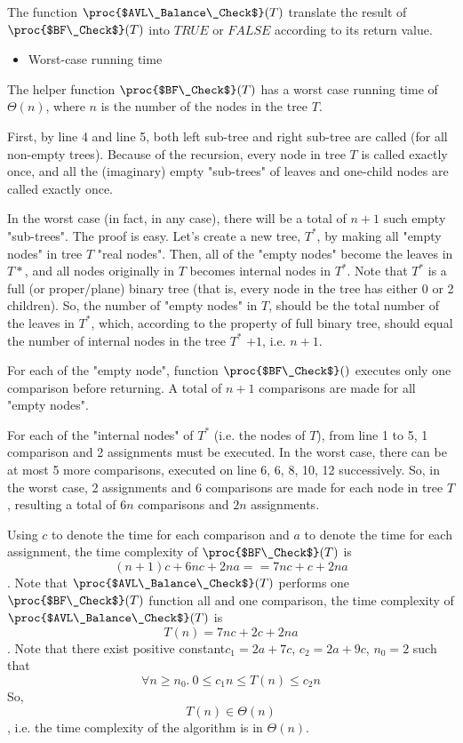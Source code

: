 \documentclass[11pt, answers]{exam}
\theoremstyle{plain}
\theoremstyle{definition}
\begin{document}
\begin{questions}
\begin{solution}
The function $\proc{$AVL\_Balance\_Check$}(T)$ translate the result of $\proc{$BF\_Check$}(T)$ into $TRUE$ or $FALSE$ according to its return value.
\begin{itemize}
\item Worst-case running time
\end{itemize}
The helper function $\proc{$BF\_Check$}(T)$ has a worst case running time of $\Theta(n)$, where $n$ is the number of the nodes in the tree $T$.

First, by line 4 and line 5, both left sub-tree and right sub-tree are called (for all non-empty trees). Because of the recursion, every node in tree $T$ is called exactly once, and all the (imaginary) empty "sub-trees" of leaves and one-child nodes are called exactly once.

In the worst case (in fact, in any case), there will be a total of $n+1$ such empty "sub-trees". The proof is easy. Let's create a new tree, $T^*$, by making all "empty nodes" in tree $T$ "real nodes". Then, all of the "empty nodes" become the leaves in $T*$, and all nodes originally in $T$ becomes internal nodes in $T^*$. Note that $T^*$ is a full (or proper/plane) binary tree (that is, every node in the tree has either 0 or 2 children). So, the number of "empty nodes" in $T$, should be the total number of the leaves in $T^*$, which, according to the property of full binary tree, should equal the number of internal nodes in the tree $T^*$ $+1$, i.e. $n+1$.

For each of the "empty node", function $\proc{$BF\_Check$}()$ executes only one comparison before returning. A total of $n+1$ comparisons are made for all "empty nodes".

For each of the "internal nodes" of $T^*$ (i.e. the nodes of $T$), from line 1 to 5, 1 comparison and 2 assignments must be executed. In the worst case, there can be at most 5 more comparisons, executed on line 6, 6, 8, 10, 12 successively. So, in the worst case, 2 assignments and 6 comparisons are made for each node in tree $T$, resulting a total of $6n$ comparisons and $2n$ assignments.

Using $c$ to denote the time for each comparison and $a$ to denote the time for each assignment, the time complexity of $\proc{$BF\_Check$}(T)$ is $$(n+1)c+6nc+2na == 7nc+c+2na$$. Note that $\proc{$AVL\_Balance\_Check$}(T)$ performs one $\proc{$BF\_Check$}(T)$ function all and one comparison, the time complexity of $\proc{$AVL\_Balance\_Check$}(T)$ is $$T(n) = 7nc+2c+2na$$.
Note that there exist positive constant$c_1=2a+7c$, $c_2=2a+9c$, $n_0=2$ such that $$\forall n\geq n_0 .\  0\leq c_1n \leq T(n) \leq c_2n$$
So, $$T(n) \in \Theta(n)$$, i.e. the time complexity of the algorithm is in $\Theta(n)$.
\end{solution}


\end{questions}
\end{document}
